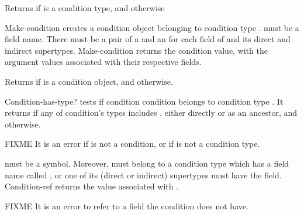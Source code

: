 \begin{entry}{%
}

Returns \schtrue{} if  is a condition type, and \schfalse{}
otherwise
\end{entry}

\begin{entry}{%
}

{\cf Make-condition} creates a condition object belonging to condition
type .  must be a field name. There must be
a pair of a  and an  for each field of
 and its direct and indirect supertypes. {\cf
  Make-condition} returns the condition value, with the argument
values associated with their respective fields.
\end{entry}

\begin{entry}{%
}

Returns \schtrue{} if  is a condition object, and \schfalse{}
otherwise.
\end{entry}

\begin{entry}{%
}

{\cf Condition-has-type?} tests if condition condition belongs to
condition type . It returns \schtrue{} if any of
condition's types includes , either directly or as
an ancestor, and \schfalse{} otherwise.

FIXME It is an error if  is not a condition, or if
 is not a condition type.
\end{entry}

\begin{entry}{%
}

 must be a symbol.
Moreover,  must belong to a condition type which has a
field name called , or one of its (direct or indirect)
supertypes must have the field. {\cf Condition-ref} returns the value
associated with .

FIXME It is an error to refer to a field the condition does not have.
\end{entry}

